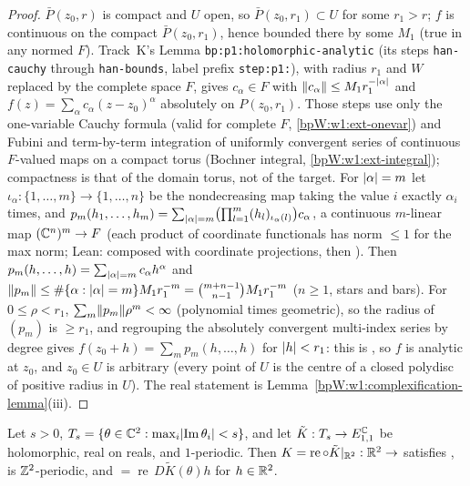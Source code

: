 \begin{proof}
\label{stepW:w1:hamargin}
$\bar P(z_0,r)$ is compact and $U$ open, so $\bar P(z_0,r_1)\subset U$ for some $r_1>r$; $f$ is continuous on the
compact $\bar P(z_0,r_1)$, hence bounded there by some $M_1$ (true in any normed $F$).
\label{stepW:w1:hacoef}
Track~K's Lemma \texttt{bp:p1:holomorphic-analytic} (its steps \texttt{han-cauchy} through \texttt{han-bounds},
label prefix \texttt{step:p1:}), with radius $r_1$ and $W$ replaced by the complete space $F$, gives $c_\alpha\in F$ with
$\lVert c_\alpha\rVert\le M_1r_1^{-\lvert \alpha\rvert}$ and $f(z)=\sum_\alpha c_\alpha(z-z_0)^\alpha$ absolutely on $P(z_0,r_1)$. Those
steps use only the one-variable Cauchy formula (valid for complete $F$, \ref{bpW:w1:ext-onevar}) and Fubini and
term-by-term integration of uniformly convergent series of continuous $F$-valued maps on a compact torus (Bochner
integral, \ref{bpW:w1:ext-integral}); compactness is that of the domain torus, not of the target.
\label{stepW:w1:hagroup}
For $\lvert \alpha\rvert=m$ let $\iota_\alpha:\{1,\dots,m\}\to\{1,\dots,n\}$ be the nondecreasing map taking the value $i$
exactly $\alpha_i$ times, and $p_m(h_1,\dots,h_m)=\sum_{\lvert \alpha\rvert=m}\bigl(\prod_{l=1}^m(h_l)_{\iota_\alpha(l)}\bigr)c_\alpha$, a
continuous $m$-linear map $(\mathbb{C}^n)^m\to F$ (each product of coordinate functionals has norm $\le1$ for the max norm;
Lean:  composed with coordinate projections, then ).
Then $p_m(h,\dots,h)=\sum_{\lvert \alpha\rvert=m}c_\alpha h^\alpha$ and $\lVert p_m\rVert\le\#\{\alpha:\lvert \alpha\rvert=m\}M_1r_1^{-m}=
\binom{m+n-1}{n-1}M_1r_1^{-m}$ ($n\ge1$, stars and bars). For $0\le\rho<r_1$, $\sum_m\lVert p_m\rVert\rho^m<\infty$ (polynomial times geometric), so the
radius of $(p_m)$ is $\ge r_1$, and regrouping the absolutely convergent multi-index series by degree gives
$f(z_0+h)=\sum_mp_m(h,\dots,h)$ for $\lvert h\rvert<r_1$: this is , so $f$ is analytic at
$z_0$, and $z_0\in U$ is arbitrary (every point of $U$ is the centre of a closed polydisc of positive radius in $U$).
\label{stepW:w1:hareal}
The real statement is Lemma~\ref{bpW:w1:complexification-lemma}(iii).
\end{proof}

\begin{corollary}\label{bpW:w1:torus-analytic}
Let $s>0$, $T_s=\{\theta\in\mathbb{C}^2:\max_i\lvert \operatorname{Im}\theta_i\rvert<s\}$, and let $\tilde K:T_s\to E^{\mathbb{C}}_{1,1}$ be
holomorphic, real on reals, and $1$-periodic. Then $K=\operatorname{re}\circ\tilde K|_{\mathbb{R}^2}:\mathbb{R}^2\to$ 
satisfies , is $\mathbb{Z}^2$-periodic, and  $=\operatorname{re}\,D\tilde K(\theta)h$
for $h\in\mathbb{R}^2$.
\end{corollary}

